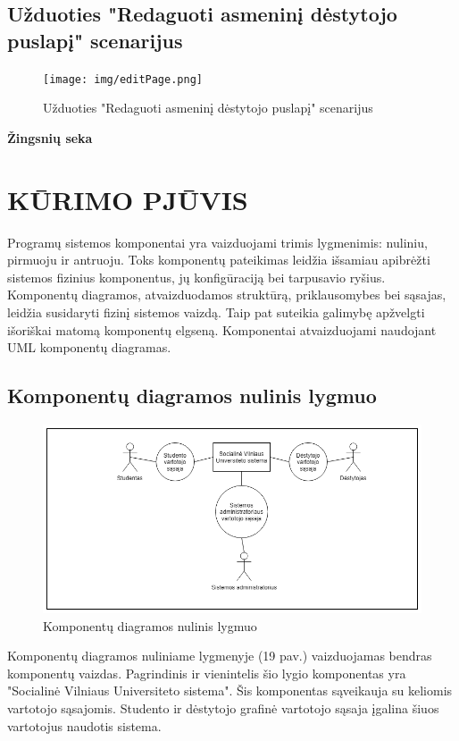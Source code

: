 \documentclass{VUMIFPSkursinis}
\begin{document}
\subsection{Užduoties "Redaguoti asmeninį dėstytojo puslapį" scenarijus}
\begin{figure}[H]
	\centering
	\texttt{[image: img/editPage.png]}
	\caption{Užduoties  "Redaguoti asmeninį dėstytojo puslapį" scenarijus}
	\label{fig:editPage}
\end{figure}
\textbf{Žingsnių seka}\\
\newpage
\section{KŪRIMO PJŪVIS}
Programų sistemos komponentai yra vaizduojami trimis lygmenimis: nuliniu, pirmuoju ir antruoju. Toks komponentų pateikimas leidžia išsamiau apibrėžti sistemos fizinius komponentus, jų konfigūraciją bei tarpusavio ryšius. Komponentų diagramos, atvaizduodamos struktūrą, priklausomybes bei sąsajas, leidžia susidaryti fizinį sistemos vaizdą. Taip pat suteikia galimybę apžvelgti išoriškai matomą komponentų elgseną. Komponentai atvaizduojami naudojant UML komponentų diagramas.

\subsection{Komponentų diagramos nulinis lygmuo}

\begin{figure}[H]
	\centering
	\includegraphics[width=\linewidth]{img/0lygmuo.png}
	\caption{Komponentų diagramos nulinis lygmuo}
	\label{fig:0lygmuo}
\end{figure}

Komponentų diagramos nuliniame lygmenyje (19 pav.) vaizduojamas bendras komponentų vaizdas. Pagrindinis ir vienintelis šio lygio komponentas yra "Socialinė Vilniaus Universiteto sistema". Šis komponentas sąveikauja su keliomis vartotojo sąsajomis. Studento ir dėstytojo grafinė vartotojo sąsaja įgalina šiuos vartotojus naudotis sistema.
\end{document}
